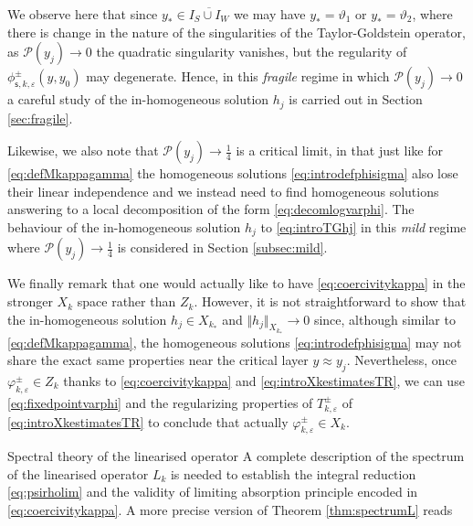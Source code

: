 \documentclass[11pt,reqno]{amsproc}
\makeatletter
\renewcommand\subsection{\@startsection{subsection}{2}%
\normalparindent{.5\linespacing\@plus.7\linespacing}{-.5em}
{\normalfont\bfseries}}
\theoremstyle{definition}
\numberwithin{equation}{section}
\newcommand{\s}{{\mathsf{s}}}
\newcommand{\ep}{\varepsilon}
\renewcommand{\P}{{\mathcal{P}}}
\makeatother
\begin{document}
We observe here that since $y_*\in \overline{I_S\cup I_W}$ we may have $y_*=\vartheta_1$ or $y_*=\vartheta_2$, where there is change in the nature of the singularities of the Taylor-Goldstein operator, as $\P(y_j)\rightarrow0$ the quadratic singularity vanishes, but the regularity of $\phi_{\s,k,\ep}^\pm(y,y_0)$ may degenerate. Hence, in this \emph{fragile} regime in which $\P(y_j)\rightarrow 0$ a careful study of the in-homogeneous solution $h_j$ is carried out in Section \ref{sec:fragile}.

Likewise, we also note that $\P(y_j)\rightarrow \frac14$ is a critical limit, in that just like for \eqref{eq:defMkappagamma} the homogeneous solutions \eqref{eq:introdefphisigma} also lose their linear independence and we instead need to find homogeneous solutions answering to a local decomposition of the form \eqref{eq:decomlogvarphi}. The behaviour of the in-homogeneous solution $h_j$ to \eqref{eq:introTGhj} in this \emph{mild} regime where $\P(y_j)\rightarrow \frac14$  is considered in Section \ref{subsec:mild}.

We finally remark that one would actually like to have \eqref{eq:coercivitykappa} in the stronger $X_k$ space rather than $Z_k$. However, it is not straightforward to show that the in-homogeneous solution $h_j\in X_{k_*}$ and $\Vert h_j \Vert_{X_{k_*}}\rightarrow 0$ since, although similar to \eqref{eq:defMkappagamma}, the homogeneous solutions \eqref{eq:introdefphisigma} may not share the exact same properties near the critical layer $y\approx y_j$. Nevertheless, once $\varphi_{k,\ep}^\pm\in Z_k$ thanks to \eqref{eq:coercivitykappa} and \eqref{eq:introXkestimatesTR}, we can use \eqref{eq:fixedpointvarphi} and the regularizing properties of $T_{k,\ep}^\pm$ of \eqref{eq:introXkestimatesTR} to conclude that actually $\varphi_{k,\ep}^\pm\in X_k$.

\subsection{Spectral theory of the linearised operator}
A complete description of the spectrum of the linearised operator $L_k$ is needed to establish the integral reduction \eqref{eq:psirholim} and the validity of limiting absorption principle encoded in \eqref{eq:coercivitykappa}. A more precise version of Theorem \ref{thm:spectrumL} reads
\end{document}
